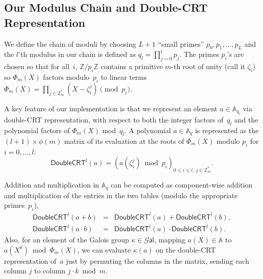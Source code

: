 \documentclass[14pt]{extarticle}
\newcommand{\A}{\mathbb{A}}
\newcommand{\Z}{\mathbb{Z}}
\newcommand{\Gal}{\mathcal{G}\mathsf{al}}
\newcommand{\dCRT}{\mathsf{DoubleCRT}}
\newcommand{\lev}{l}
\newcommand{\ql}{{q_{\lev}}}
\begin{document}
\subsection{Our Modulus Chain and Double-CRT Representation}
\label{sec:dcrt}
We define the chain of moduli by choosing $L+1$ ``small primes'' $p_0,
p_1,\ldots,p_{L}$ and the $\lev$'th modulus in our chain is defined
as $\ql=\prod_{j=0}^\lev p_j$. 
The primes $p_i$'s are chosen so that
for all~$i$, $\Z/p_i\Z$ contains a primitive $m$-th root of unity
(call it $\zeta_i$) so $\Phi_m(X)$ factors modulo~$p_i$ to linear
terms $\Phi_m(X)= \prod_{j\in\Z_m^*} (X-\zeta_i^j)\pmod{p_i}$.

A key feature of our implementation is that we represent an element
$a\in\A_\ql$ via double-CRT representation, with respect to both the
integer factors of~$\ql$ and the polynomial factors of $\Phi_m(X)$
mod~$\ql$. A polynomial $a\in\A_q$ is represented as the $(\lev+1)
\times \phi(m)$ matrix of its evaluation at the roots of $\Phi_m(X)$
modulo $p_i$ for $i=0,\ldots,\lev$:
\[\dCRT^\lev(a) = \left(
  a(\zeta_i^j)\bmod p_i \right)_{0\le i\le\lev,~ j\in\Z_m^*}.
\]

Addition and multiplication in $\A_q$ can be computed as component-wise
addition and multiplication of the entries in the two tables (modulo
the appropriate primes~$p_i$),
\begin{eqnarray*}
   \dCRT^\lev(a+b) &=& \dCRT^\lev(a)+\dCRT^\lev(b),\\
   \dCRT^\lev(a \cdot b) &=& \dCRT^\lev(a) \cdot \dCRT^\lev(b). 
\end{eqnarray*}
Also, for an element of the Galois group $\kappa\in\Gal$, mapping
$a(X)\in\A$ to $a(X^k)\bmod\Phi_m(X)$, we can evaluate $\kappa(a)$
on the double-CRT representation of~$a$ just by permuting the columns
in the matrix, sending each column $j$ to column $j\cdot k \bmod m$.

\end{document}
